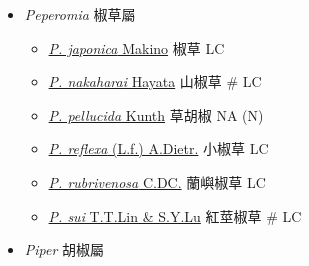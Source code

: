 
  \begin{itemize}
 \item[] \textit{Peperomia} 椒草屬
                                
  \begin{itemize}
        \item[] \href{http://www.theplantlist.org/tpl1.1/search?q=Peperomia+japonica}{\textit{P. japonica} Makino}   椒草   LC
        \item[] \href{http://www.theplantlist.org/tpl1.1/search?q=Peperomia+nakaharai}{\textit{P. nakaharai} Hayata}   山椒草  \# LC
        \item[] \href{http://www.theplantlist.org/tpl1.1/search?q=Peperomia+pellucida}{\textit{P. pellucida} Kunth}   草胡椒   NA (N)
        \item[] \href{http://www.theplantlist.org/tpl1.1/search?q=Peperomia+reflexa}{\textit{P. reflexa} (L.f.) A.Dietr.}   小椒草   LC
        \item[] \href{http://www.theplantlist.org/tpl1.1/search?q=Peperomia+rubrivenosa}{\textit{P. rubrivenosa} C.DC.}   蘭嶼椒草   LC
        \item[] \href{http://www.theplantlist.org/tpl1.1/search?q=Peperomia+sui}{\textit{P. sui} T.T.Lin \& S.Y.Lu}   紅莖椒草  \# LC
  \end{itemize}
 \item[] \textit{Piper} 胡椒屬
                                

\end{itemize}
